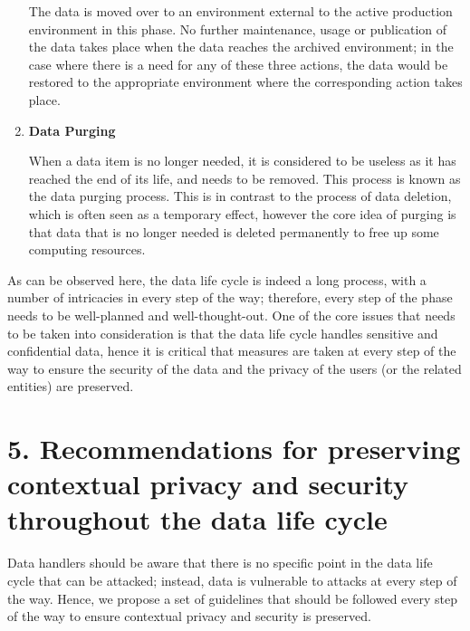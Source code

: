 \documentclass{sigchi}
\begin{document}
\begin{enumerate}
The data is moved over to an environment external to the active production environment in this phase. No further maintenance, usage or publication of the data takes place when the data reaches the archived environment; in the case where there is a need for any of these three actions, the data would be restored to the appropriate environment where the corresponding action takes place.

\item \textbf{Data Purging}

When a data item is no longer needed, it is considered to be useless as it has reached the end of its life, and needs to be removed. This process is known as the data purging process. This is in contrast to the process of data deletion, which is often seen as a temporary effect, however the core idea of purging is that data that is no longer needed is deleted permanently to free up some computing resources. 

\end{enumerate}

As can be observed here, the data life cycle is indeed a long process, with a number of intricacies in every step of the way; therefore, every step of the phase needs to be well-planned and well-thought-out. One of the core issues that needs to be taken into consideration is that the data life cycle handles sensitive and confidential data, hence it is critical that measures are taken at every step of the way to ensure the security of the data and the privacy of the users (or the related entities) are preserved.

\section{5. Recommendations for preserving contextual privacy and security throughout the data life cycle}

Data handlers should be aware that there is no specific point in the data life cycle that can be attacked; instead, data is vulnerable to attacks at every step of the way. Hence, we propose a set of guidelines that should be followed every step of the way to ensure contextual privacy and security is preserved.
\end{document}
